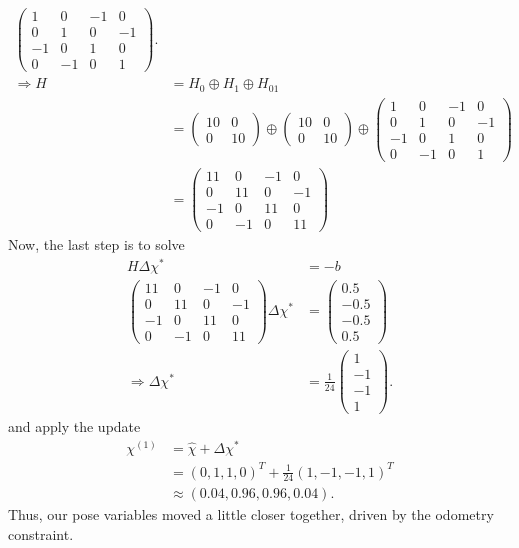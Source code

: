 \begin{align}
\begin{pmatrix}
           1 & 0 & -1 & 0\\ 0 & 1 & 0 & -1 \\ -1 & 0 & 1 & 0 \\ 0 & -1 & 0 & 1
    \end{pmatrix}.\\
    \Rightarrow H &= H_0 \oplus H_1 \oplus H_{01}\\
    &= \begin{pmatrix}
           10 & 0 \\ 0 & 10
    \end{pmatrix} \oplus \begin{pmatrix}
                             10 & 0 \\ 0 & 10
    \end{pmatrix} \oplus \begin{pmatrix}
                             1 & 0 & -1 & 0\\ 0 & 1 & 0 & -1 \\ -1 & 0 & 1 & 0 \\ 0 & -1 & 0 & 1
    \end{pmatrix}\\
    & = \begin{pmatrix}
            11 & 0 & -1 & 0\\ 0 & 11 & 0 & -1 \\ -1 & 0 & 11 & 0 \\ 0 & -1 & 0 & 11
    \end{pmatrix}
\end{align}
Now, the last step is to solve
\begin{align}
    H\Delta \chi^* &= -b\\
    \begin{pmatrix}
        11 & 0 & -1 & 0\\ 0 & 11 & 0 & -1 \\ -1 & 0 & 11 & 0 \\ 0 & -1 & 0 & 11
    \end{pmatrix} \Delta \chi^* &=
    \begin{pmatrix}
        0.5 \\ -0.5 \\ -0.5 \\ 0.5
    \end{pmatrix} \\
    \Rightarrow \Delta \chi^* &= \frac{1}{24} \begin{pmatrix}
                                                  1 \\ -1 \\ -1 \\ 1
    \end{pmatrix}.
\end{align}
and apply the update
\begin{align}
    \chi^{(1)} &= \hat{\chi} + \Delta \chi^{*}\\
    &= (0,1,1,0)^T + \frac{1}{24}(1, -1, -1, 1)^{T}\\
    &\approx (0.04, 0.96, 0.96, 0.04).
\end{align}
Thus, our pose variables moved a little closer together, driven by the odometry constraint.

